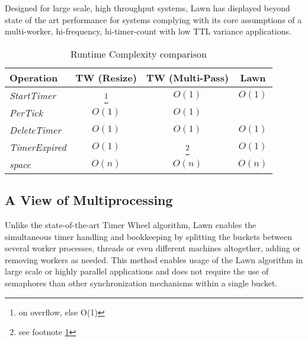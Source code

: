 \documentclass[conference]{IEEEtran}
\begin{document}
Designed for large scale, high throughput systems, Lawn has displayed beyond state of the art performance for systems complying with its core assumptions of a multi-worker, hi-frequency, hi-timer-count with low TTL variance applications.

\begin{table}[ht]
	\begin{center}
		\begin{tabular}{l|c|c|c}
			\textbf{Operation} & \textbf{TW (Resize)} & \textbf{TW (Multi-Pass)} & \textbf{Lawn} \\
			\hline
			\textit{StartTimer} & \boldmath{$O(n)$}\footnote{\label{overflowfn}on overflow, else O(1)} & $O(1)$ & $O(1)$ \\
			\textit{PerTick} & $O(1)$ & $O(1)$ & \boldmath{$O(t\sim1)$} \\
			\textit{DeleteTimer} & $O(1)$ & $O(1)$ & $O(1)$ \\
			\textit{TimerExpired} & $O(1)$ & \boldmath{$O(n)$}\footnote{see footnote \ref{overflowfn}} & $O(1)$ \\
			\textit{space} & $O(n)$ & $O(n)$ & $O(n)$ \\
		\end{tabular}
		\linebreak
		\caption{Runtime Complexity comparison}
	\end{center}
\end{table}

\subsection{A View of Multiprocessing}
Unlike the state-of-the-art Timer Wheel algorithm, Lawn enables the simultaneous timer handling and bookkeeping by splitting the buckets between several worker processes, threads or even different machines altogether, adding or removing workers as needed. This method enables usage of the Lawn algorithm in large scale or highly parallel applications and does not require the use of semaphores than other synchronization mechanisms within a single bucket.
\end{document}
